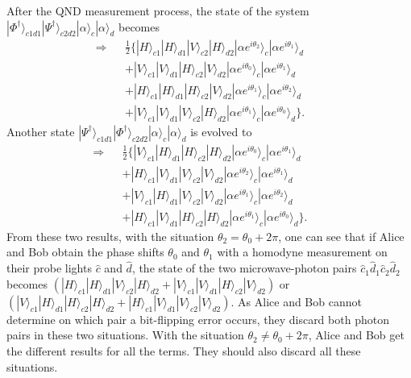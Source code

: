 \documentclass[showpacs,aps,graphicx,twocolumn]{revtex4}
\begin{document}
After the QND measurement process, the state of the system
$|\Phi^{\dag}\rangle_{c1d1}|\Psi^{\dag}\rangle_{c2d2}|\alpha\rangle_{c}|\alpha\rangle_{d}$
becomes
\begin{eqnarray}\label{eq11}
\Longrightarrow\!\!\!\!&&\frac{1}{2}\{|H\rangle_{c1}|H\rangle_{d1}|V\rangle_{c2}
|H\rangle_{d2}|\alpha e^{i\theta_{2}}\rangle_{c}|\alpha e^{i\theta_{1}}\rangle_{d}\nonumber\\
&&+|V\rangle_{c1}|V\rangle_{d1}|H\rangle_{c2}|V\rangle_{d2}|
\alpha e^{i\theta_{0}}\rangle_{c}|\alpha e^{i\theta_{1}}\rangle_{d}\nonumber\\
&&+|H\rangle_{c1}|H\rangle_{d1}|H\rangle_{c2}|V\rangle_{d2}|
\alpha e^{i\theta_{1}}\rangle_{c}|\alpha e^{i\theta_{2}}\rangle_{d}\nonumber\\
&&+|V\rangle_{c1}|V\rangle_{d1}|V\rangle_{c2}|H\rangle_{d2}| \alpha e^{i\theta_{1}}
\rangle_{c}|\alpha e^{i\theta_{0}}\rangle_{d}\}.\;\;\;\;\;\;
\end{eqnarray}
Another state
$|\Psi^{\dag}\rangle_{c1d1}|\Phi^{\dag}\rangle_{c2d2}|\alpha\rangle_{c}|\alpha\rangle_{d}$
is evolved to
\begin{eqnarray}\label{eq12}
\Longrightarrow\!\!\!\!&&\frac{1}{2}\{|V\rangle_{c1}|H\rangle_{d1}|H\rangle_{c2}
|H\rangle_{d2}|\alpha e^{i\theta_{0}}\rangle_{c}|\alpha e^{i\theta_{1}}\rangle_{d}\nonumber\\
&&+|H\rangle_{c1}|V\rangle_{d1}|V\rangle_{c2}|V\rangle_{d2}|\alpha
e^{i\theta_{2}}\rangle_{c}
|\alpha e^{i\theta_{1}}\rangle_{d}\nonumber\\
&&+|V\rangle_{c1}|H\rangle_{d1}|V\rangle_{c2}|V\rangle_{d2}|\alpha e^{i\theta_{1}}
\rangle_{c}
|\alpha e^{i\theta_{2}}\rangle_{d}\nonumber\\
&&+|H\rangle_{c1}|V\rangle_{d1}|H\rangle_{c2}|H\rangle_{d2}|\alpha e^{i\theta_{1}}
\rangle_{c} |\alpha e^{i\theta_{0}}\rangle_{d}\}.\;\;\;\;\;\;
\end{eqnarray}
From these two results, with the situation
$\theta_{2}=\theta_{0}+2\pi$, one can see that if Alice and Bob
obtain the phase shifts $\theta_{0}$ and $\theta_{1}$ with a homodyne measurement on
their probe lights $\hat{c}$ and $\hat{d}$, the state of the two
microwave-photon pairs $\hat{c}_1\hat{d}_1\hat{c}_2\hat{d}_2$
becomes $(|H\rangle_{c1}|H\rangle_{d1}|V\rangle_{c2}|H\rangle_{d2}
+|V\rangle_{c1}|V\rangle_{d1}|H\rangle_{c2}|V\rangle_{d2})$ or
$(|V\rangle_{c1}|H\rangle_{d1}|H\rangle_{c2}|H\rangle_{d2}
+|H\rangle_{c1}|V\rangle_{d1}|V\rangle_{c2}|V\rangle_{d2})$. As
Alice and Bob cannot determine on which pair a bit-flipping error
occurs, they discard both photon pairs in these two situations. With the
situation $\theta_{2}\neq\theta_{0}+2\pi$, Alice and Bob get the
different results for all the terms. They should also discard all
these situations.
\end{document}
